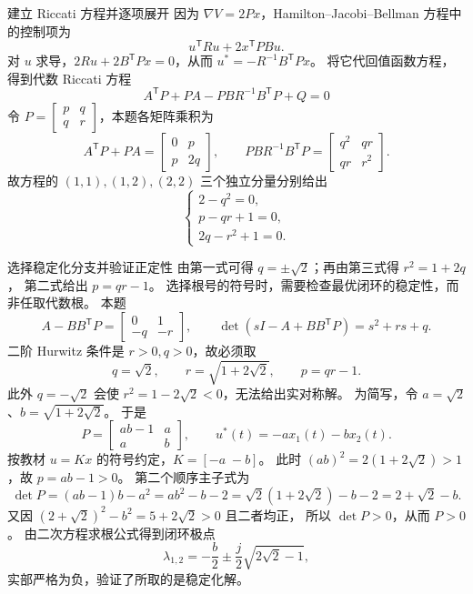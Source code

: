 \documentclass[11pt]{article}
\begin{document}
\begin{solution}
\begin{proofstep}{建立 Riccati 方程并逐项展开}
因为 $\nabla V=2Px$，Hamilton--Jacobi--Bellman 方程中的控制项为
\[
 u^{\mathsf T}Ru+2x^{\mathsf T}PBu.
\]
对 $u$ 求导，$2Ru+2B^{\mathsf T}Px=0$，从而
$u^*=-R^{-1}B^{\mathsf T}Px$。
将它代回值函数方程，得到代数 Riccati 方程
\[
 A^{\mathsf T}P+PA-PBR^{-1}B^{\mathsf T}P+Q=0
\]
令 $P=\begin{bmatrix}p&q\\q&r\end{bmatrix}$，本题各矩阵乘积为
\[
 A^{\mathsf T}P+PA=\begin{bmatrix}0&p\\p&2q\end{bmatrix},\qquad
 PBR^{-1}B^{\mathsf T}P=\begin{bmatrix}q^2&qr\\qr&r^2\end{bmatrix}.
\]
故方程的 $(1,1),(1,2),(2,2)$ 三个独立分量分别给出
\[
 \begin{cases}
 2-q^2=0,\\
 p-qr+1=0,\\
 2q-r^2+1=0.
 \end{cases}
\]
\end{proofstep}
\begin{proofstep}{选择稳定化分支并验证正定性}
由第一式可得 $q=\pm\sqrt2$；再由第三式得 $r^2=1+2q$，
第二式给出 $p=qr-1$。
选择根号的符号时，需要检查最优闭环的稳定性，而非任取代数根。
本题
\[
 A-BB^{\mathsf T}P=\begin{bmatrix}0&1\\-q&-r\end{bmatrix},\qquad
 \det(sI-A+BB^{\mathsf T}P)=s^2+rs+q.
\]
二阶 Hurwitz 条件是 $r>0,q>0$，故必须取
\[
 q=\sqrt2,\qquad r=\sqrt{1+2\sqrt2},\qquad p=qr-1.
\]
此外 $q=-\sqrt2$ 会使 $r^2=1-2\sqrt2<0$，无法给出实对称解。
为简写，令 $a=\sqrt2$、$b=\sqrt{1+2\sqrt2}$。
于是
\[
 \boxed{P=\begin{bmatrix}ab-1&a\\a&b\end{bmatrix},\qquad
 u^*(t)=-a x_1(t)-b x_2(t).}
\]
按教材 $u=Kx$ 的符号约定，$K=[-a\;-b]$。
此时 $(ab)^2=2(1+2\sqrt2)>1$，故 $p=ab-1>0$。
第二个顺序主子式为
\[
 \det P=(ab-1)b-a^2=ab^2-b-2
 =\sqrt2(1+2\sqrt2)-b-2=2+\sqrt2-b.
\]
又因 $(2+\sqrt2)^2-b^2=5+2\sqrt2>0$ 且二者均正，
所以 $\det P>0$，从而 $P>0$。
由二次方程求根公式得到闭环极点
\[
 \boxed{\lambda_{1,2}=-\frac b2\pm\frac{j}{2}\sqrt{2\sqrt2-1},}
\]
实部严格为负，验证了所取的是稳定化解。
\end{proofstep}


\end{solution}
\end{document}
